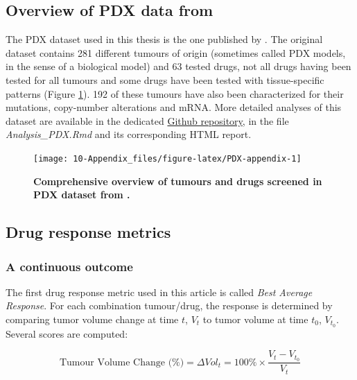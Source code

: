 \documentclass[a4paper,12pt,twoside,onecolumn,openright,final,oldfontcommands]{memoir}
\begin{document}
\subsection{\texorpdfstring{Overview of PDX data from
\citet{gao2015high}}{Overview of PDX data from @gao2015high}}\label{overview-of-pdx-data-from-gao2015high}

The PDX dataset used in this thesis is the one published by
\citet{gao2015high}. The original dataset contains 281 different tumours
of origin (sometimes called PDX models, in the sense of a biological
model) and 63 tested drugs, not all drugs having been tested for all
tumours and some drugs have been tested with tissue-specific patterns
(Figure \ref{fig:PDX-appendix}). 192 of these tumours have also been
characterized for their mutations, copy-number alterations and mRNA.
More detailed analyses of this dataset are available in the dedicated
\href{https://github.com/JonasBeal/Causal_Precision_Medicine}{Github
repository}, in the file \emph{Analysis\_PDX.Rmd} and its corresponding
HTML report.

\begin{figure}

{\centering \texttt{[image: 10-Appendix\_files/figure-latex/PDX-appendix-1]} 

}

\caption[Comprehensive overview of tumours and drugs screened in PDX dataset from @gao2015high]{\textbf{Comprehensive overview of tumours and
drugs screened in PDX dataset from \citet{gao2015high}.}}\label{fig:PDX-appendix}
\end{figure}




\subsection{Drug response metrics}\label{drug-response-metrics}

\subsubsection{A continuous outcome}\label{a-continuous-outcome}

The first drug response metric used in this article is called \emph{Best
Average Response}. For each combination tumour/drug, the response is
determined by comparing tumor volume change at time \(t\), \(V_t\) to
tumor volume at time \(t_0\), \(V_{t_0}\). Several scores are computed:

\[\text{Tumour Volume Change (\%)} = \Delta Vol_t = 100\% \times \dfrac{V_t-V_{t_0}}{V_t}\]
\end{document}
